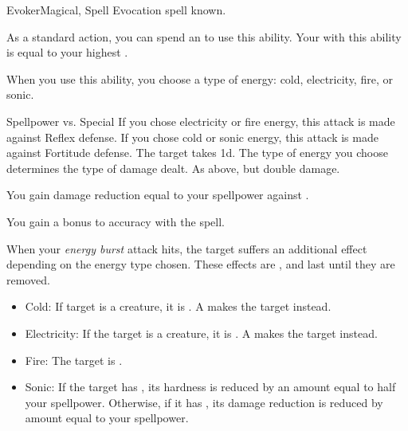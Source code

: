     \begin{feat}{Evoker}{Magical, Spell}
        \featpre Evocation spell known.
        \featben

         As a standard action, you can spend an  to use this ability.
        Your  with this ability is equal to your highest .
        \begin{ability}
            \begin{spelltargetinginfo}
                \spellspecial When you use this ability, you choose a type of energy: cold, electricity, fire, or sonic.
            \end{spelltargetinginfo}
            \begin{spelleffects}
                \begin{spellattack}{Spellpower vs. Special}
                    \spellspecial If you chose electricity or fire energy, this attack is made against Reflex defense. If you chose cold or sonic energy, this attack is made against Fortitude defense.
                    \spellsuccess The target takes  \plus1d.
                    The type of energy you choose determines the type of damage dealt.
                    \spellcritical As above, but double damage.
                \end{spellattack}
            \end{spelleffects}
        \end{ability}

         You gain damage reduction equal to your spellpower against .

         You gain a  bonus to accuracy with the  spell.

         When your \textit{energy burst} attack hits, the target suffers an additional effect depending on the energy type chosen.
        These effects are , and last until they are removed.
        \begin{itemize}
            \item Cold: If target is a creature, it is \fatigued.
                A  makes the target \exhausted instead.
            \item Electricity: If the target is a creature, it is \dazed.
                A  makes the target \stunned instead.
            \item Fire: The target is \ignited.
            \item Sonic: If the target has , its hardness is reduced by an amount equal to half your spellpower. Otherwise, if it has , its damage reduction is reduced by amount equal to your spellpower.
        \end{itemize}


\end{feat}
